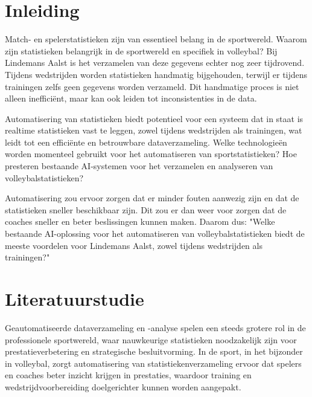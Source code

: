 
\section{Inleiding}%
\label{sec:inleiding}

Match- en spelerstatistieken zijn van essentieel belang in de sportwereld. Waarom zijn statistieken belangrijk in de sportwereld en specifiek in volleybal? Bij Lindemans Aalst is het verzamelen van deze gegevens echter nog zeer tijdrovend. Tijdens wedstrijden worden statistieken handmatig bijgehouden, terwijl er tijdens trainingen zelfs geen gegevens worden verzameld. Dit handmatige proces is niet alleen inefficiënt, maar kan ook leiden tot inconsistenties in de data.

Automatisering van statistieken biedt potentieel voor een systeem dat in staat is realtime statistieken vast te leggen, zowel tijdens wedstrijden als trainingen, wat leidt tot een efficiënte en betrouwbare dataverzameling. Welke technologieën worden momenteel gebruikt voor het automatiseren van sportstatistieken? Hoe presteren bestaande AI-systemen voor het verzamelen en analyseren van volleybalstatistieken?

Automatisering zou ervoor zorgen dat er minder fouten aanwezig zijn en dat de statistieken sneller beschikbaar zijn. Dit zou er dan weer voor zorgen dat de coaches sneller en beter beslissingen kunnen maken. Daarom dus: "Welke bestaande AI-oplossing voor het automatiseren van volleybalstatistieken biedt de meeste voordelen voor Lindemans Aalst, zowel tijdens wedstrijden als trainingen?"

\section{Literatuurstudie}%
\label{sec:literatuurstudie}
Geautomatiseerde dataverzameling en -analyse spelen een steeds grotere rol in de professionele sportwereld, waar nauwkeurige statistieken noodzakelijk zijn voor prestatieverbetering en strategische besluitvorming. In de sport, in het bijzonder in volleybal, zorgt automatisering van statistiekenverzameling ervoor dat spelers en coaches beter inzicht krijgen in prestaties, waardoor training en wedstrijdvoorbereiding doelgerichter kunnen worden aangepakt.

